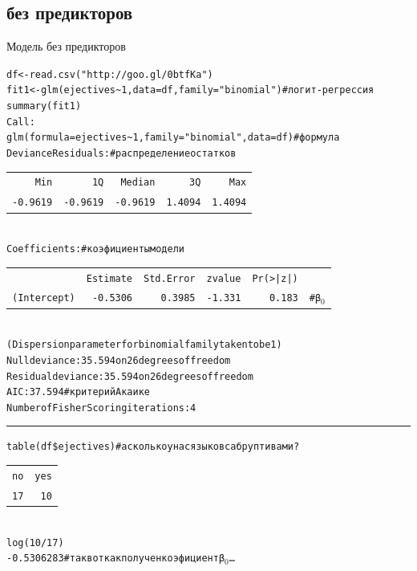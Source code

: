 \subsection{без предикторов}
\begin{frame}{Модель без предикторов}
\vspace{-5mm}
\scriptsize
\begin{alltt}
df <- read.csv("http://goo.gl/0btfKa")\\
fit1 <- \alert{glm(ejectives \textasciitilde 1}, data = df, \alert{family = "binomial")} \hfill \# логит-регрессия\\
summary(fit1)\medskip\\
Call:\\
glm(formula = ejectives \textasciitilde 1, family = "binomial"{}, data = df) \hfill \# \alert{формула}\medskip\\
Deviance Residuals: \hfill \# \alert{распределение остатков} \\
\begin{tabular}{rrrrr}
    Min   &    1Q &  Median  &     3Q &     Max  \\
-0.9619  & -0.9619 &  -0.9619 &  1.4094 &  1.4094\\  
\end{tabular}
\medskip\\
Coefficients: \hfill \# \alert{коэфициенты модели}\\
\begin{tabular}{rrrrrr}
    &       \alert{Estimate} & Std. Error & z value & Pr(>|z|)&\\
\alert{(Intercept)} &  \alert{-0.5306}  &   0.3985 &  -1.331  &  0.183 & \hfill \# \alert{β$_0$}\\
\end{tabular} \medskip\\
(Dispersion parameter for binomial family taken to be 1)\medskip\\
    Null deviance: 35.594  on 26  degrees of freedom\\
Residual deviance: 35.594  on 26  degrees of freedom\\
AIC: 37.594 \hfill \# \alert{критерий Акаике}\medskip\\
Number of Fisher Scoring iterations: 4\\
\rule{\linewidth}{0.4pt}
\alert{table(df\$ejectives)} \hfill \# \alert{а сколько у нас языков с абруптивами?}\\
\begin{tabular}{rr}
no & yes\\ 
 17  & 10 \\
\end{tabular} \\
\alert{log(10/17)}\\
-0.5306283 \hfill \# \alert{так вот как получен коэфициент β$_0$…}
\end{alltt}
\normalsize
\end{frame}
